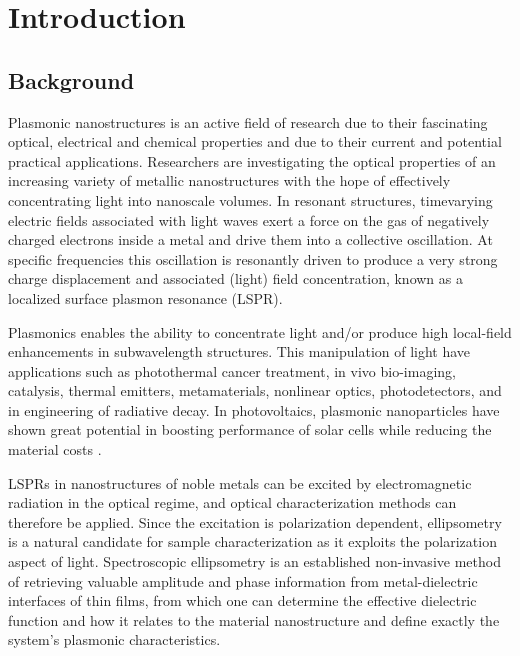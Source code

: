 
\chapter{Introduction}

\section{Background}
Plasmonic nanostructures is an active field of research due to their fascinating optical, electrical and chemical properties and due to their current and potential practical applications\cite{Trugler_metallicnanoparticles}\cite{Stockman:11}. Researchers are investigating the optical properties of an increasing variety of metallic nanostructures with the hope of effectively concentrating light into nanoscale volumes. In resonant structures, timevarying electric fields associated with light waves exert a force on the gas of negatively charged electrons inside a metal and drive them into a collective oscillation. At specific frequencies this oscillation is resonantly driven to produce a very strong charge displacement and associated (light) field concentration, known as a localized surface plasmon resonance (LSPR). 

Plasmonics enables the ability to concentrate light and/or produce high local-field enhancements in subwavelength structures. This manipulation of light have applications such as photothermal cancer treatment, in vivo bio-imaging, catalysis, thermal emitters, metamaterials, nonlinear optics, photodetectors, and in engineering of radiative decay\cite{Au_nanorods_review}\cite{Schuller_plasmonicapplications_review}. In photovoltaics, plasmonic nanoparticles have shown great potential in boosting performance of solar cells while reducing the material costs \cite{Trugler_metallicnanoparticles}\cite{Green_plasmonic_solarcells}.

LSPRs in nanostructures of noble metals can be excited by electromagnetic radiation in the optical regime, and optical characterization methods can therefore be applied. Since the excitation is polarization dependent\cite{maier}, ellipsometry is a natural candidate for sample characterization as it exploits the polarization aspect of light. Spectroscopic ellipsometry is an established non-invasive method of retrieving valuable amplitude and phase information from metal-dielectric interfaces of thin films, from which one can determine the effective dielectric function and how it relates to the material nanostructure and define exactly the system's plasmonic characteristics\cite{hans_arwin_reviewarticle}.


